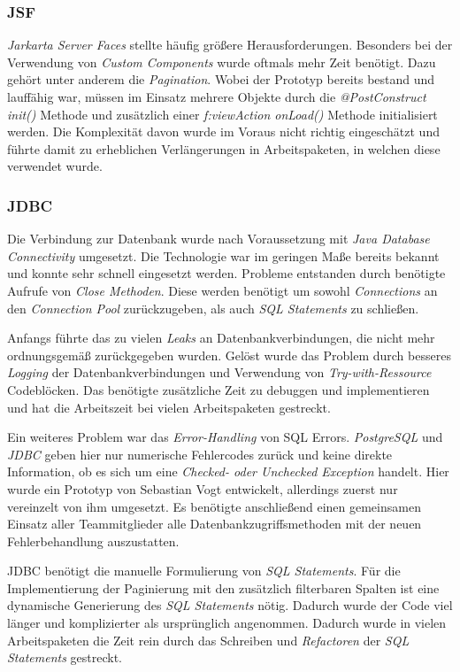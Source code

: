 \subsubsection{JSF}

\emph{Jarkarta Server Faces} stellte häufig größere Herausforderungen. Besonders bei der Verwendung von \emph{Custom Components} wurde oftmals mehr Zeit benötigt. Dazu gehört unter anderem die \emph{Pagination}. Wobei der Prototyp bereits bestand und lauffähig war, müssen im Einsatz mehrere Objekte durch die \emph{@PostConstruct init()} Methode und zusätzlich einer \emph{f:viewAction onLoad()} Methode initialisiert werden.
Die Komplexität davon wurde im Voraus nicht richtig eingeschätzt und führte damit zu erheblichen Verlängerungen in Arbeitspaketen, in welchen diese verwendet wurde.

\subsubsection{JDBC}

Die Verbindung zur Datenbank wurde nach Voraussetzung mit \emph{Java Database Connectivity} umgesetzt. Die Technologie war im geringen Maße bereits bekannt und konnte sehr schnell eingesetzt werden. Probleme entstanden durch benötigte Aufrufe von \emph{Close Methoden}. Diese werden benötigt um sowohl \emph{Connections} an den \emph{Connection Pool} zurückzugeben, als auch \emph{SQL Statements} zu schließen.

Anfangs führte das zu vielen \emph{Leaks} an Datenbankverbindungen, die nicht mehr ordnungsgemäß zurückgegeben wurden. Gelöst wurde das Problem durch besseres \emph{Logging} der Datenbankverbindungen und Verwendung von \emph{Try-with-Ressource} Codeblöcken. Das benötigte zusätzliche Zeit zu debuggen und implementieren und hat die Arbeitszeit bei vielen Arbeitspaketen gestreckt.\newline

Ein weiteres Problem war das \emph{Error-Handling} von SQL Errors. \emph{PostgreSQL} und \emph{JDBC} geben hier nur numerische Fehlercodes zurück und keine direkte Information, ob es sich um eine \emph{Checked- oder Unchecked Exception} handelt. Hier wurde ein Prototyp von Sebastian Vogt entwickelt, allerdings zuerst nur vereinzelt von ihm umgesetzt. Es benötigte anschließend einen gemeinsamen Einsatz aller Teammitglieder alle Datenbankzugriffsmethoden mit der neuen Fehlerbehandlung auszustatten. \newline

JDBC benötigt die manuelle Formulierung von \emph{SQL Statements}. Für die Implementierung der Paginierung mit den zusätzlich filterbaren Spalten ist eine dynamische Generierung des \emph{SQL Statements} nötig. Dadurch wurde der Code viel länger und komplizierter als ursprünglich angenommen. Dadurch wurde in vielen Arbeitspaketen die Zeit rein durch das Schreiben und \emph{Refactoren} der \emph{SQL Statements} gestreckt.

